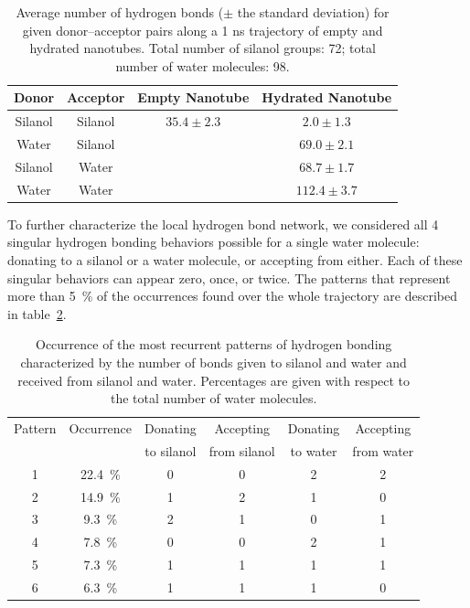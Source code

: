 \documentclass[thesis]{subfiles}
\begin{document}
\begin{table}[ht]
    \centering
    \caption{Average number of hydrogen bonds ($\pm$ the standard deviation)
    for given donor--acceptor pairs along a 1 ns trajectory of empty and
    hydrated nanotubes. Total number of silanol groups: 72; total number of
    water molecules: 98.}
    \label{tab:imogolite:hbonds:count}
    \begin{tabular}{c c c c}
        \toprule
        Donor   & Acceptor & Empty Nanotube  & Hydrated Nanotube \\
        \midrule
        Silanol & Silanol  & $35.4 \pm 2.3$  & $2.0  \pm 1.3$    \\
        Water   & Silanol  &                 & $69.0 \pm 2.1$    \\
        Silanol & Water    &                 & $68.7 \pm 1.7$    \\
        Water   & Water    &                 & $112.4 \pm 3.7$   \\
        \bottomrule
    \end{tabular}
\end{table}

To further characterize the local hydrogen bond network, we considered all 4
singular hydrogen bonding behaviors possible for a single water molecule:
donating to a silanol or a water molecule, or accepting from either. Each of
these singular behaviors can appear zero, once, or twice. The patterns that
represent more than {5~\%} of the occurrences found over the whole trajectory are
described in table~\ref{tab:imogolite:hbonds:patterns}.

\begin{table}[ht]
    \centering
    \caption{Occurrence of the most recurrent patterns of hydrogen bonding
    characterized by the number of bonds given to silanol and water and received
    from silanol and water. Percentages are given with respect to the total
    number of water molecules.}
    \label{tab:imogolite:hbonds:patterns}
    \begin{tabular}{c c c c c c}
        \toprule
        Pattern & Occurrence & Donating   & Accepting    & Donating & Accepting  \\
                &            & to silanol & from silanol & to water & from water \\
        \midrule
            1   & 22.4~\%     &      0     &      0       &    2     &     2      \\
            2   & 14.9~\%     &      1     &      2       &    1     &     0      \\
            3   & 9.3~\%      &      2     &      1       &    0     &     1      \\
            4   & 7.8~\%      &      0     &      0       &    2     &     1      \\
            5   & 7.3~\%      &      1     &      1       &    1     &     1      \\
            6   & 6.3~\%      &      1     &      1       &    1     &     0      \\
        \bottomrule
    \end{tabular}
\end{table}
\end{document}
